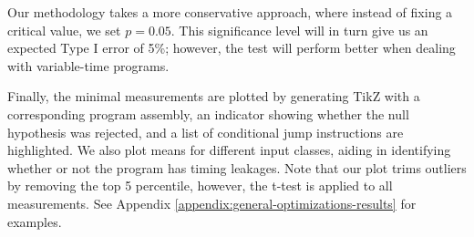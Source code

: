 Our methodology takes a more conservative approach, where instead of fixing a critical value, we set $p = 0.05$. This significance level will in turn give us an expected Type I error of 5\%; however, the test will perform better when dealing with variable-time programs.

Finally, the minimal measurements are plotted by generating TikZ with a corresponding program assembly, an indicator showing whether the null hypothesis was rejected, and a list of conditional jump instructions are highlighted. We also plot means for different input classes, aiding in identifying whether or not the program has timing leakages. Note that our plot trims outliers by removing the top 5 percentile, however, the t-test is applied to all measurements.
See Appendix \ref{appendix:general-optimizations-results} for examples.
